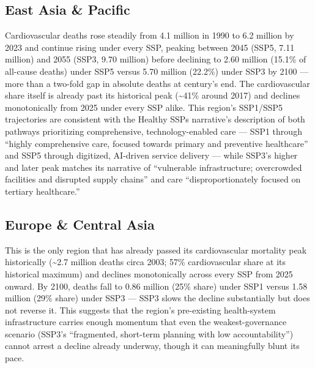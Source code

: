 \subsection*{East Asia \& Pacific}
Cardiovascular deaths rose steadily from 4.1 million in 1990 to 6.2 million by 2023 and continue rising under every SSP, peaking between 2045 (SSP5, 7.11 million) and 2055 (SSP3, 9.70 million) before declining to 2.60 million (15.1\% of all-cause deaths) under SSP5 versus 5.70 million (22.2\%) under SSP3 by 2100 — more than a two-fold gap in absolute deaths at century's end. The cardiovascular share itself is already past its historical peak (\textasciitilde41\% around 2017) and declines monotonically from 2025 under every SSP alike. This region's SSP1/SSP5 trajectories are consistent with the Healthy SSPs narrative's description of both pathways prioritizing comprehensive, technology-enabled care — SSP1 through ``highly comprehensive care, focused towards primary and preventive healthcare'' and SSP5 through digitized, AI-driven service delivery — while SSP3's higher and later peak matches its narrative of ``vulnerable infrastructure; overcrowded facilities and disrupted supply chains'' and care ``disproportionately focused on tertiary healthcare.''

\subsection*{Europe \& Central Asia}
This is the only region that has already passed its cardiovascular mortality peak historically (\textasciitilde2.7 million deaths circa 2003; 57\% cardiovascular share at its historical maximum) and declines monotonically across every SSP from 2025 onward. By 2100, deaths fall to 0.86 million (25\% share) under SSP1 versus 1.58 million (29\% share) under SSP3 — SSP3 slows the decline substantially but does not reverse it. This suggests that the region's pre-existing health-system infrastructure carries enough momentum that even the weakest-governance scenario (SSP3's ``fragmented, short-term planning with low accountability'') cannot arrest a decline already underway, though it can meaningfully blunt its pace.

